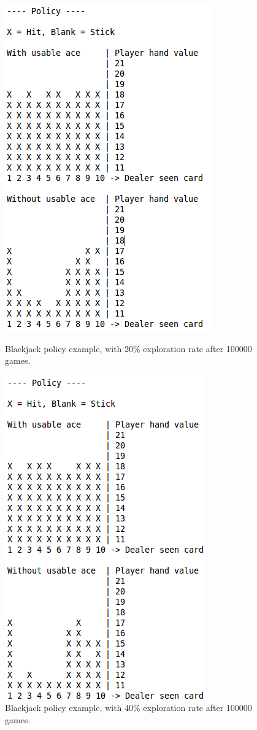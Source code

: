 \documentclass[12pt]{article}
\begin{document}
\begin{figure}[btph!]
\centering
\begin{minipage}[t]{0.45\linewidth}
	\includegraphics[scale=0.45]{images/blackjack_0_2_Q}
	\caption{Blackjack policy example, with 20\% exploration rate after 100000 games.}
	\label{fig:blackjack_0_2_Q}
\end{minipage}
\quad
\begin{minipage}[t]{0.45\linewidth}
	\includegraphics[scale=0.45]{images/blackjack_0_4_Q}
	\caption{Blackjack policy example, with 40\% exploration rate after 100000 games.}
	\label{fig:blackjack_0_4_Q}
\end{minipage}	

\end{figure}
\end{document}
